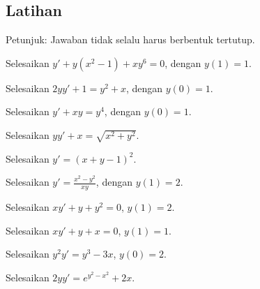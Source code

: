 \subsection{Latihan}

Petunjuk: Jawaban tidak selalu harus berbentuk tertutup.

\begin{exercise}
Selesaikan
$y'+ y(x^2-1)+xy^6 = 0$, dengan $y(1)=1$.
\end{exercise}

\begin{exercise}
Selesaikan $2yy' + 1 = y^2 + x$, dengan $y(0)=1$.
\end{exercise}

\begin{exercise}
Selesaikan $y' + xy = y^4$, dengan $y(0)=1$.
\end{exercise}

\begin{exercise}
Selesaikan $yy' + x = \sqrt{x^2 + y^2}$.
\end{exercise}

\begin{exercise}
Selesaikan $y' = {(x+y-1)}^2$.
\end{exercise}

\begin{exercise}
Selesaikan $y' = \frac{x^2-y^2}{x y}$, dengan $y(1) = 2$.
\end{exercise}

\setcounter{exercise}{100}

\begin{exercise}
Selesaikan $xy'+y+y^2 = 0$, $y(1)=2$.
\end{exercise}

\begin{exercise}
Selesaikan $xy'+y +x = 0$, $y(1)=1$.
\end{exercise}

\begin{exercise}
Selesaikan $y^2y' = y^3-3x$, $y(0)=2$.
\end{exercise}

\begin{exercise}
Selesaikan $2yy' = e^{y^2-x^2} + 2x$.
\end{exercise}


